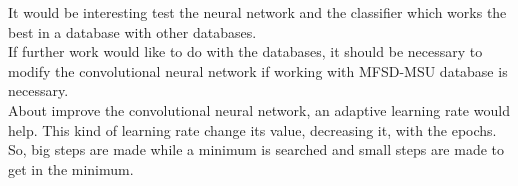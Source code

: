 It would be interesting test the neural network and the classifier which works the best in a database with other databases. \\

If further work would like to do with the databases, it should be necessary to modify the convolutional neural network if working with MFSD-MSU database is necessary.\\

About improve the convolutional neural network, an adaptive learning rate would help. This kind of learning rate change its value, decreasing it, with the epochs. So, big steps are made while a minimum is searched and small steps are made to get in the minimum.\\
